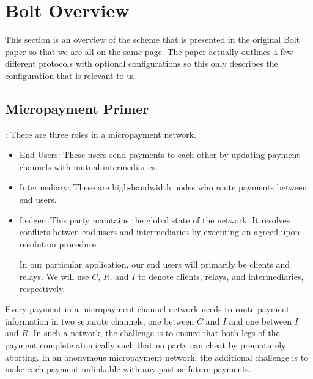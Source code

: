 \documentclass{article}
\begin{document}
\section{Bolt Overview}

This section is an overview of the scheme that is presented in the original Bolt paper so that we are all on the same page. The paper actually outlines a few different protocols with optional configurations so this only describes the configuration that is relevant to us.

\subsection{Micropayment Primer}: There are three roles in a micropayment network.
\begin{itemize}
\item End Users: These users send payments to each other by updating payment channels with mutual intermediaries.
\item Intermediary: These are high-bandwidth nodes who route payments between end users.
\item Ledger: This party maintains the global state of the network. It resolves conflicts betwen end users and intermediaries by executing an agreed-upon resolution procedure.

In our particular application, our end users will primarily be clients and relays. We will use $C$, $R$, and $I$ to denote clients, relays, and intermediaries, respectively.
\end{itemize}

Every payment in a micropayment channel network needs to route payment information in two separate channels, one between $C$ and $I$ and one between $I$ and $R$. In such a network, the challenge is to ensure that both legs of the payment complete atomically such that no party can cheat by prematurely aborting. In an anonymous micropayment network, the additional challenge is to make each payment unlinkable with any past or future payments.
\end{document}
